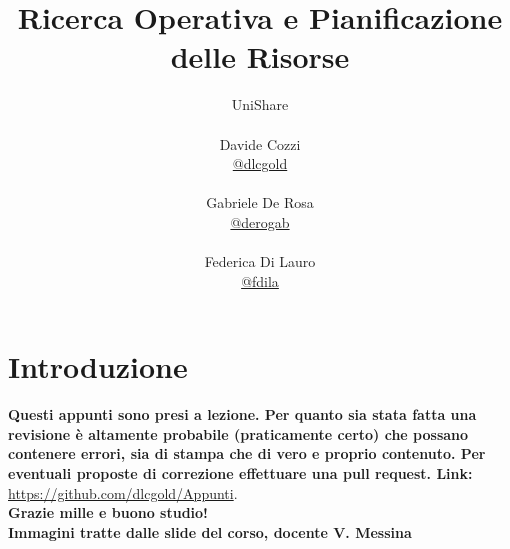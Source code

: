 \documentclass[a4paper,12pt, oneside]{book}
\title{Ricerca Operativa e Pianificazione delle Risorse}
\author{UniShare\\\\Davide Cozzi\\\href{https://t.me/dlcgold}{@dlcgold}\\\\Gabriele De Rosa\\\href{https://t.me/derogab}{@derogab} \\\\Federica Di Lauro\\\href{https://t.me/f_dila}{@f\textunderscore dila}}
\date{}
\begin{document}
\maketitle

\newtheorem{teorema}{Teorema}
\newtheorem{definizione}{Definizione}
\newtheorem{esempio}{Esempio}
\newtheorem{corollario}{Corollario}
\newtheorem{lemma}{Lemma}
\newtheorem{osservazione}{Osservazione}
\newtheorem{nota}{Nota}
\newtheorem{esercizio}{Esercizio}
\tableofcontents
\renewcommand{\chaptermark}[1]{%
  \markboth{\chaptername
    \ \thechapter.\ #1}{}}
\renewcommand{\sectionmark}[1]{\markright{\thesection.\ #1}}
\chapter{Introduzione}
\textbf{Questi appunti sono presi a lezione. Per quanto sia stata
  fatta una revisione è altamente probabile (praticamente certo)
  che possano contenere errori, sia di stampa che di vero e proprio
  contenuto. Per eventuali proposte di correzione effettuare una
  pull request. Link: } \url{https://github.com/dlcgold/Appunti}.\\
\textbf{Grazie mille e buono studio!}\\
\textbf{Immagini tratte dalle slide del corso, docente V. Messina}
\end{document}
